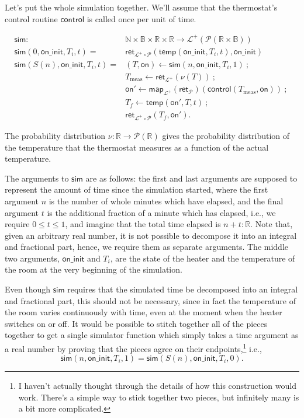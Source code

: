 \documentclass{article}           %
\newcommand{\R}{\mathbb{R}}
\newcommand{\nat}{\mathbb{N}}
\newcommand{\bool}{\mathbb{B}}
\newcommand{\Prob}{\mathcal{P}}
\newcommand{\PLower}{\mathcal{L}^+}
\newcommand{\map}[1]{\mathsf{map}_{#1}}
\newcommand{\ret}[1]{\mathsf{ret}_{#1}}
\newcommand{\then}{\ ;\ }
\begin{document}
Let's put the whole simulation together. We'll assume that the thermostat's control routine $\mathsf{control}$ is called once per unit of time.

\begin{align*}
\mathsf{sim} :\ & \nat \times \bool \times \R \times \R \to \PLower(\Prob(\R \times \bool))
\\
\mathsf{sim}(0, \mathsf{on\_init}, T_i, t) = 
  &\ret{\PLower \circ \Prob}(\mathsf{temp}(\mathsf{on\_init}, T_i, t), \mathsf{on\_init})
\\
\mathsf{sim}(S(n), \mathsf{on\_init}, T_i, t) = 
&(T, \mathsf{on}) \leftarrow \mathsf{sim}(n, \mathsf{on\_init}, T_i, 1)
 \then
 \\&T_\text{meas} \leftarrow \ret{\PLower}(\nu(T))
 \then
 \\ &\mathsf{on}' \leftarrow \map{\PLower}(\ret{\Prob})(\mathsf{control}(T_\text{meas}, \mathsf{on}))
 \then
 \\ &T_f \leftarrow \mathsf{temp}(\mathsf{on'}, T, t)
 \then
 \\ &\ret{\PLower \circ \Prob}(T_f, \mathsf{on'}).
\end{align*}

The probability distribution $\nu : \R \to \Prob(\R)$ gives the probability distribution of the temperature that the thermostat measures as a function of the actual temperature.

The arguments to $\mathsf{sim}$ are as follows: the first and last arguments are supposed to represent the amount of time since the simulation started, where the first argument $n$ is the number of whole minutes which have elapsed, and the final argument $t$ is the additional fraction of a minute which has elapsed, i.e., we require $0 \le t \le 1$, and imagine that the total time elapsed is $n + t : \R$. Note that, given an arbitrary real number, it is not possible to decompose it into an integral and fractional part, hence, we require them as separate arguments. The middle two arguments, $\mathsf{on\_init}$ and $T_i$, are the state of the heater and the temperature of the room at the very beginning of the simulation.

Even though $\mathsf{sim}$ requires that the simulated time be decomposed into an integral and fractional part, this should not be necessary, since in fact the temperature of the room varies continuously with time, even at the moment when the heater switches on or off. It would be possible to stitch together all of the pieces together to get a single simulator function which simply takes a time argument as a real number by proving that the pieces agree on their endpoints,\footnote{I haven't actually thought through the details of how this construction would work. There's a simple way to stick together two pieces, but infinitely many is a bit more complicated.} i.e.,
\[
\mathsf{sim}(n, \mathsf{on\_init}, T_i, 1) = \mathsf{sim}(S(n), \mathsf{on\_init}, T_i, 0).
\]
\end{document}
